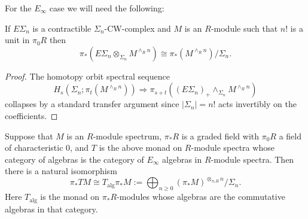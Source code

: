 \documentclass[leqno,oneside,english]{elsarticle}
\begin{document}
For the $E_{\infty}$ case we will need the following:
\begin{lemma}\label{lem:HR-mod-vs-R-mod-extended-powers}
   If $E\Sigma_n$ is a contractible $\Sigma_n$-CW-complex and $M$ is an
   $R$-module such that $n!$ is a unit in $\pi_0 R$ then 
   \[
    \pi_* (E\Sigma_n\otimes _{\Sigma_n}M^{\wedge_{R}n}) \cong
    \pi_* (M^{\wedge_{R}n})/\Sigma_n.
  \]
\end{lemma}
\begin{proof}
  The homotopy orbit spectral sequence 
  \[ 
  H_s(\Sigma_n; \pi_t(M^{\wedge_{R}n})) \Longrightarrow 
  \pi_{s+t}((E\Sigma_n)_{+} \wedge_{\Sigma_n} M^{\wedge_R n})
  \] 
  collapses by a standard transfer argument since $|\Sigma_n|=n!$
  acts invertibly on the coefficients.
\end{proof} 

\begin{prop} \label{prop:algebraic-description-for-e-infty-monad}
  Suppose that $M$ is an $R$-module spectrum, $\pi_*R$ is a graded field with $\pi_0
  R$ a field of characteristic 0, and $T$
  is the above monad on $R$-module spectra whose category of algebras is
  the category of $E_{\infty}$ algebras in $R$-module spectra. Then there
  is a natural isomorphism 
  \[ \pi_* TM \cong T_{\mathrm{alg}}\pi_* M :=
  \bigoplus_{n\geq 0} (\pi_*M)^{\otimes_{\pi_*R}  n}/{\Sigma_n}.\] 
  Here $T_{\mathrm{alg}}$ is the monad on $\pi_*R$-modules whose algebras are the
  commutative algebras in that category.
\end{prop}




\end{document}

